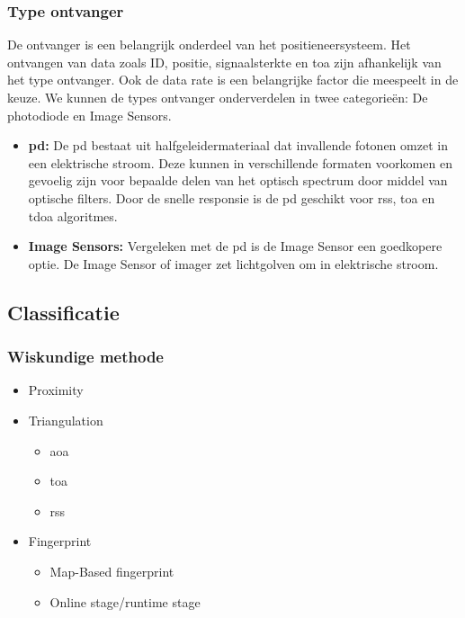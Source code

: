 		\subsubsection{Type ontvanger}
		De ontvanger is een belangrijk onderdeel van het positieneersysteem. Het ontvangen van data zoals ID, positie, signaalsterkte en \gls{toa} zijn afhankelijk van het type ontvanger. Ook de data rate is een belangrijke factor die meespeelt in de keuze. We kunnen de types ontvanger onderverdelen in twee categorie\"en: De photodiode en Image Sensors.
			\begin{itemize}
				\item \textbf{\gls{pd}:} De \gls{pd} bestaat uit halfgeleidermateriaal dat invallende fotonen omzet in een elektrische stroom. Deze kunnen in verschillende formaten voorkomen en gevoelig zijn voor bepaalde delen van het optisch spectrum door middel van optische filters. Door de snelle responsie is de \gls{pd} geschikt voor \gls{rss}, \gls{toa} en \gls{tdoa} algoritmes.
				
				\item \textbf{Image Sensors:}  Vergeleken met de \gls{pd} is de Image Sensor een goedkopere optie. De Image Sensor of imager zet lichtgolven om in elektrische stroom.
			\end{itemize}
	\subsection{Classificatie}
		\subsubsection{Wiskundige methode}
		
			\begin{itemize}
				\item Proximity
				\item Triangulation
					\begin{itemize}
						\item \acrfull{aoa}
						\item \acrfull{toa}
						\item \acrfull{rss}
					\end{itemize}
				\item Fingerprint
					\begin{itemize}
						\item Map-Based fingerprint
						\item Online stage/runtime stage
					\end{itemize}
			\end{itemize}
